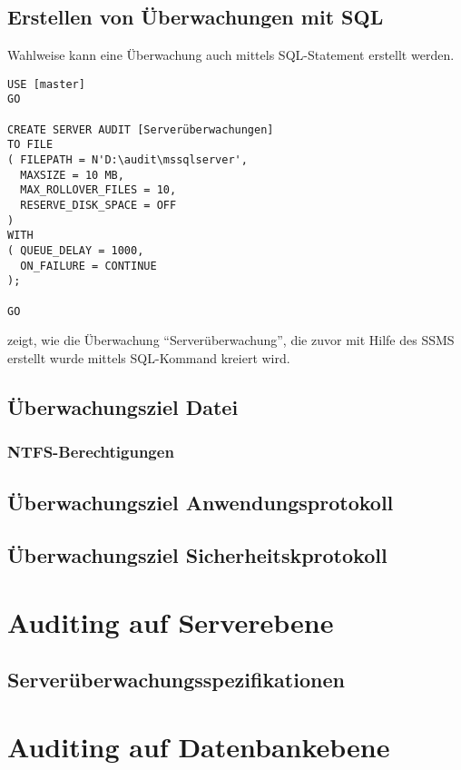       \subsection{Erstellen von Überwachungen mit SQL}
        Wahlweise kann eine Überwachung auch mittels SQL-Statement erstellt
        werden.
        \begin{lstlisting}[language=ms_sql,caption={Erstellen
        einer Überwachung},label=sql21_01]
USE [master]
GO

CREATE SERVER AUDIT [Serverüberwachungen]
TO FILE 
( FILEPATH = N'D:\audit\mssqlserver',
  MAXSIZE = 10 MB,
  MAX_ROLLOVER_FILES = 10,
  RESERVE_DISK_SPACE = OFF
)
WITH
( QUEUE_DELAY = 1000,
  ON_FAILURE = CONTINUE
);

GO          
        \end{lstlisting}
         zeigt, wie die Überwachung
        \enquote{Serverüberwachung}, die zuvor mit Hilfe des SSMS erstellt wurde
        mittels SQL-Kommand kreiert wird.
      \subsection{Überwachungsziel Datei}
        \subsubsection{NTFS-Berechtigungen}
      
      \subsection{Überwachungsziel Anwendungsprotokoll}
      
      \subsection{Überwachungsziel Sicherheitskprotokoll}
      
    \section{Auditing auf Serverebene}
      
      \subsection{Serverüberwachungsspezifikationen} 
    \section{Auditing auf Datenbankebene}
    
